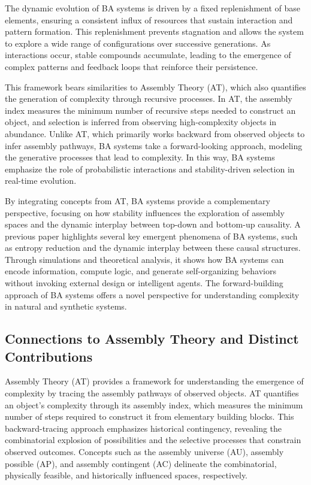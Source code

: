 \documentclass[entropy,article,submit,pdftex,oneauthor]{Definitions/mdpi}
\begin{document}
The dynamic evolution of BA systems is driven by a fixed replenishment of base elements, ensuring a consistent influx of resources that sustain interaction and pattern formation. This replenishment prevents stagnation and allows the system to explore a wide range of configurations over successive generations. As interactions occur, stable compounds accumulate, leading to the emergence of complex patterns and feedback loops that reinforce their persistence.

This framework bears similarities to Assembly Theory (AT), which also quantifies the generation of complexity through recursive processes. In AT, the assembly index measures the minimum number of recursive steps needed to construct an object, and selection is inferred from observing high-complexity objects in abundance. Unlike AT, which primarily works backward from observed objects to infer assembly pathways, BA systems take a forward-looking approach, modeling the generative processes that lead to complexity. In this way, BA systems emphasize the role of probabilistic interactions and stability-driven selection in real-time evolution.

By integrating concepts from AT, BA systems provide a complementary perspective, focusing on how stability influences the exploration of assembly spaces and the dynamic interplay between top-down and bottom-up causality. A previous paper \cite{adler2024howinfoevolves} highlights several key emergent phenomena of BA systems, such as entropy reduction and the dynamic interplay between these causal structures. Through simulations and theoretical analysis, it shows how BA systems can encode information, compute logic, and generate self-organizing behaviors without invoking external design or intelligent agents. The forward-building approach of BA systems offers a novel perspective for understanding complexity in natural and synthetic systems.

\subsection{Connections to Assembly Theory and Distinct Contributions}

Assembly Theory (AT) \cite{walker2023nature} provides a framework for understanding the emergence of complexity by tracing the assembly pathways of observed objects. AT quantifies an object’s complexity through its assembly index, which measures the minimum number of steps required to construct it from elementary building blocks. This backward-tracing approach emphasizes historical contingency, revealing the combinatorial explosion of possibilities and the selective processes that constrain observed outcomes. Concepts such as the assembly universe (AU), assembly possible (AP), and assembly contingent (AC) delineate the combinatorial, physically feasible, and historically influenced spaces, respectively.
\end{document}
